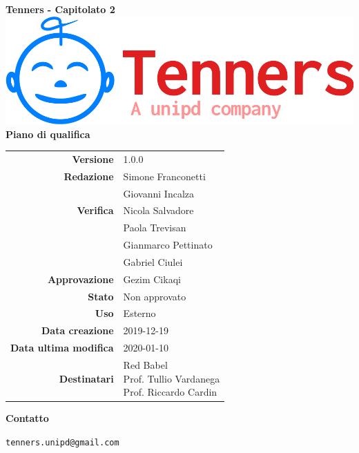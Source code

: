\begin{titlepage}
	\begin{center}
		\large \textbf{Tenners - Capitolato 2}
		\vfill
		\includegraphics[scale = 0.3]{./res/img/logo.png}\\
		\vfill
		\Huge \textbf{Piano di qualifica}

        \vfill
        \large

        \begin{tabular}{r|l}
                        \textbf{Versione} & 1.0.0 \\
                        \textbf{Redazione} &
                        Simone Franconetti \\&
                        Giovanni Incalza \\
                        \textbf{Verifica} &
                        Nicola Salvadore \\&
                        Paola Trevisan \\&
												Gianmarco Pettinato \\&
												Gabriel Ciulei \\
                        \textbf{Approvazione} & Gezim Cikaqi \\
                        \textbf{Stato} & Non approvato \\
                        \textbf{Uso} &  Esterno\\
                        \textbf{Data creazione} &  2019-12-19\\
                        \textbf{Data ultima modifica} &  2020-01-10\\
                        \textbf{Destinatari} & \parbox[t]{5cm}{Red Babel\\Prof. Tullio Vardanega\\Prof. Riccardo Cardin}
                \end{tabular}
                \vfill
                \normalsize
                \vfill
                \textbf{Contatto}

                \texttt{tenners.unipd@gmail.com}

	\end{center}
\end{titlepage}
